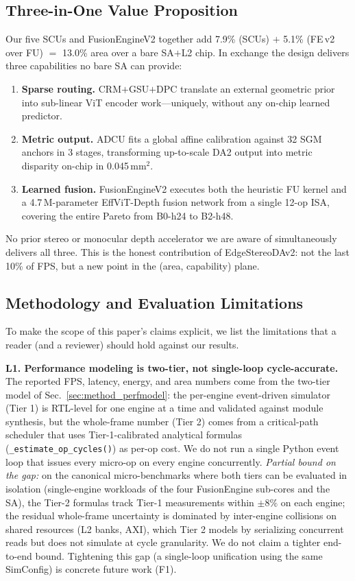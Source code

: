 \documentclass[journal]{IEEEtran}
\begin{document}
\subsection{Three-in-One Value Proposition}
\label{sec:value}
Our five SCUs and FusionEngineV2 together add 7.9\% (SCUs) $+$ 5.1\% (FE\,v2 over FU) $=$ 13.0\% area over a bare SA$+$L2 chip. In exchange the design delivers three capabilities no bare SA can provide:
\begin{enumerate}
\item \textbf{Sparse routing.} CRM$+$GSU$+$DPC translate an external geometric prior into sub-linear ViT encoder work---uniquely, without any on-chip learned predictor.
\item \textbf{Metric output.} ADCU fits a global affine calibration against 32 SGM anchors in 3 stages, transforming up-to-scale DA2 output into metric disparity on-chip in 0.045\,mm$^2$.
\item \textbf{Learned fusion.} FusionEngineV2 executes both the heuristic FU kernel and a 4.7\,M-parameter EffViT-Depth fusion network from a single 12-op ISA, covering the entire Pareto from B0-h24 to B2-h48.
\end{enumerate}
No prior stereo or monocular depth accelerator we are aware of simultaneously delivers all three. This is the honest contribution of EdgeStereoDAv2: not the last 10\% of FPS, but a new point in the (area, capability) plane.

\subsection{Methodology and Evaluation Limitations}
\label{sec:limitations}

To make the scope of this paper's claims explicit, we list the limitations that a reader (and a reviewer) should hold against our results.

\textbf{L1. Performance modeling is two-tier, not single-loop cycle-accurate.}
The reported FPS, latency, energy, and area numbers come from the two-tier model of Sec.~\ref{sec:method_perfmodel}: the per-engine event-driven simulator (Tier 1) is RTL-level for one engine at a time and validated against module synthesis, but the whole-frame number (Tier 2) comes from a critical-path scheduler that uses Tier-1-calibrated analytical formulas (\texttt{\_estimate\_op\_cycles()}) as per-op cost. We do not run a single Python event loop that issues every micro-op on every engine concurrently. \emph{Partial bound on the gap:} on the canonical micro-benchmarks where both tiers can be evaluated in isolation (single-engine workloads of the four FusionEngine sub-cores and the SA), the Tier-2 formulas track Tier-1 measurements within $\pm 8\%$ on each engine; the residual whole-frame uncertainty is dominated by inter-engine collisions on shared resources (L2 banks, AXI), which Tier 2 models by serializing concurrent reads but does not simulate at cycle granularity. We do not claim a tighter end-to-end bound. Tightening this gap (a single-loop unification using the same SimConfig) is concrete future work (F1).
\end{document}
